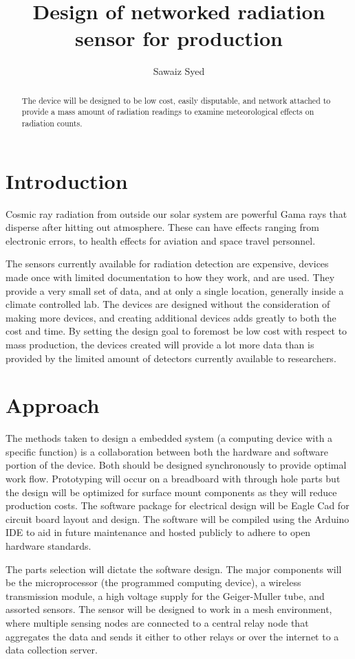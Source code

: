 \documentclass[10pt]{Article}
\author{Sawaiz Syed}
\title{Design of networked radiation sensor for production}
\begin{document}
\maketitle

\begin{abstract}
The device will be designed to be low cost, easily disputable, and network attached to provide a mass amount of radiation readings to examine meteorological effects on radiation counts.
\end{abstract}

\section{Introduction}
Cosmic ray radiation from outside our solar system are powerful Gama rays that disperse after hitting out atmosphere. These can have effects ranging from electronic errors, to health effects for aviation and space travel personnel.

The sensors currently available for radiation detection are expensive, devices made once with limited documentation to how they work, and are used. They provide a very small set of data, and at only a single location, generally inside a climate controlled lab. The devices are designed without the consideration of making more devices, and creating additional devices adds greatly to both the cost and time. By setting the design goal to foremost be low cost with respect to mass production, the devices created will provide a lot more data than is provided by the limited amount of detectors currently available to researchers.

\section{Approach}
The methods taken to design a embedded system (a computing device with a specific function) is a collaboration between both the hardware and software portion of the device. Both should be designed synchronously to provide optimal work flow. Prototyping will occur on a breadboard with through hole parts but the design will be optimized for surface mount components as they will reduce production costs. The software package for electrical design will be Eagle Cad for circuit board layout and design. The software will be compiled using the Arduino IDE to aid in future maintenance and hosted publicly to adhere to open hardware standards.

The parts selection will dictate the software design. The major components will be the microprocessor (the programmed computing device), a wireless transmission module, a high voltage supply for the Geiger-Muller tube, and assorted sensors. The sensor will be designed to work in a mesh environment, where multiple sensing nodes are connected to a central relay node that aggregates the data and sends it either to other relays or over the internet to a data collection server.
\end{document}
